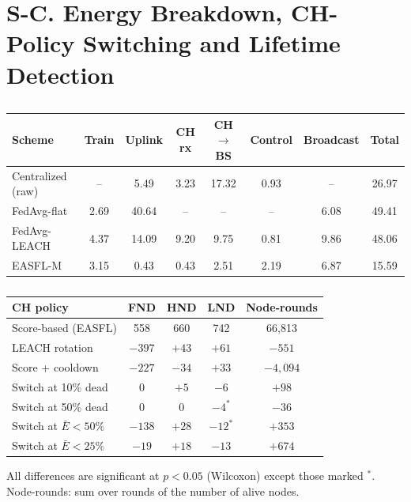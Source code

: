 \section*{S-C. Energy Breakdown, CH-Policy Switching and Lifetime Detection}
\setcounter{table}{4}
\begin{table}[h]
\caption{}\label{tab:s5}
\centering\scriptsize\setlength{\tabcolsep}{2.2pt}
\begin{tabular}{@{}lccccccc@{}}
\toprule
Scheme & Train & Uplink & CH rx & CH$\to$BS & Control & Broadcast & Total\\
\midrule
Centralized (raw) & -- & 5.49 & 3.23 & 17.32 & 0.93 & -- & 26.97\\
FedAvg-flat & 2.69 & 40.64 & -- & -- & -- & 6.08 & 49.41\\
FedAvg-LEACH & 4.37 & 14.09 & 9.20 & 9.75 & 0.81 & 9.86 & 48.06\\
EASFL-M & 3.15 & 0.43 & 0.43 & 2.51 & 2.19 & 6.87 & 15.59\\
\bottomrule
\end{tabular}
\end{table}
\begin{table}[h]
\caption{}\label{tab:s6}
\centering\scriptsize\setlength{\tabcolsep}{3pt}
\begin{tabular}{@{}lcccc@{}}
\toprule
CH policy & FND & HND & LND & Node-rounds\\
\midrule
Score-based (EASFL) & 558 & 660 & 742 & 66{,}813\\
LEACH rotation & $-397$ & $+43$ & $+61$ & $-551$\\
Score + cooldown & $-227$ & $-34$ & $+33$ & $-4{,}094$\\
Switch at 10\% dead & 0 & $+5$ & $-6$ & $+98$\\
Switch at 50\% dead & 0 & 0 & $-4^{\ast}$ & $-36$\\
Switch at $\bar E<50\%$ & $-138$ & $+28$ & $-12^{\ast}$ & $+353$\\
Switch at $\bar E<25\%$ & $-19$ & $+18$ & $-13$ & $+674$\\
\bottomrule
\end{tabular}

\vspace{1mm}\parbox{\columnwidth}{\scriptsize All differences are significant at $p<0.05$ (Wilcoxon) except those marked $^\ast$. Node-rounds: sum over rounds of the number of alive nodes.}
\end{table}
